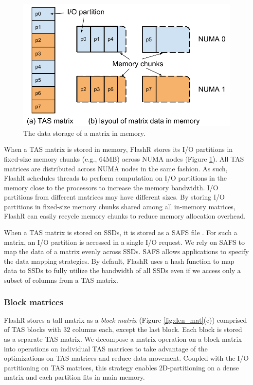 \begin{figure}
	\centering
	\includegraphics[scale=0.4]{FlashMatrix_figs/matrix_mem.pdf}
	\vspace{-5pt}
	\caption{The data storage of a matrix in memory.}
	\label{fig:mem_store}
  \vspace{-12pt}
\end{figure}

When a TAS matrix is stored in memory, FlashR stores its I/O partitions in
fixed-size memory chunks (e.g., 64MB) across NUMA nodes (Figure \ref{fig:mem_store}).
All TAS matrices are distributed across NUMA nodes in the same fashion. 
As such, FlashR schedules threads to perform computation on I/O partitions
in the memory close to the processors to increase the memory bandwidth.
I/O partitions from different matrices may have different sizes. By storing
I/O partitions in fixed-size memory chunks shared among all in-memory matrices,
FlashR can easily recycle memory chunks to reduce memory allocation overhead.

When a TAS matrix is stored on SSDs, it is stored as a SAFS file \cite{safs}.
For such a matrix, an I/O partition is accessed in a single I/O request.
We rely on SAFS to map the data of a matrix evenly across SSDs. SAFS allows
applications to specify the data mapping strategies. By default, FlashR uses
a hash function to map data to SSDs to fully utilize the bandwidth of all SSDs
even if we access only a subset of columns from a TAS matrix.

\subsubsection{Block matrices} \label{sec:block_mat}
FlashR stores a tall matrix as a \textit{block matrix} 
(Figure \ref{fig:den_mat}(c)) comprised of TAS blocks with $32$ columns each,
except the last block. Each block is stored as a separate TAS matrix. 
We decompose a matrix operation
on a block matrix into operations on individual TAS matrices to take advantage
of the optimizations on TAS matrices and reduce data movement.
Coupled with the I/O partitioning on TAS matrices, this strategy enables
2D-partitioning on a dense matrix and each partition fits in main memory.

